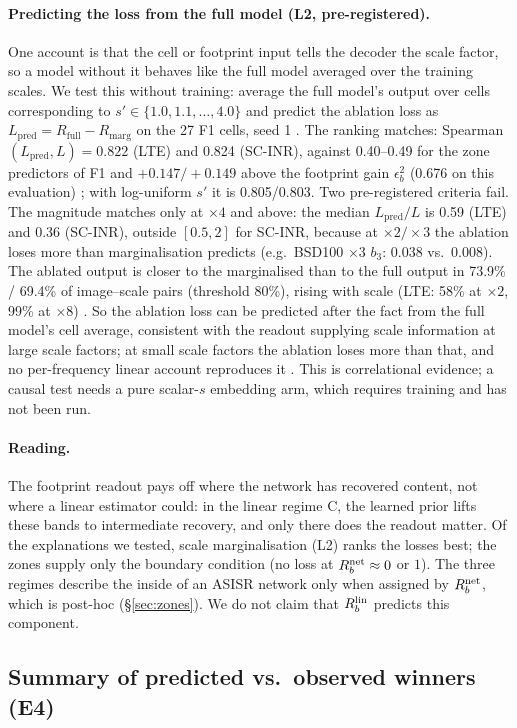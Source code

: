 \paragraph{Predicting the loss from the full model (L2, pre-registered).}
One account is that the cell or footprint input tells the
decoder the scale factor, so a model without it behaves like the full model
averaged over the training scales. We test this without training: average
the full model's output over cells corresponding to $s'\in\{1.0,1.1,\dots,4.0\}$
and predict the ablation loss as $L_{\mathrm{pred}}=R_{\mathrm{full}}-R_{\mathrm{marg}}$
on the 27 F1 cells, seed 1 . The ranking matches:
Spearman$(L_{\mathrm{pred}},L)=0.822$ (LTE) and 0.824 (SC-INR), against
0.40--0.49 for the zone predictors of F1 and $+0.147/+0.149$ above the
footprint gain $\epsilon_b^2$ (0.676 on this evaluation) ; with
log-uniform $s'$ it is 0.805/0.803. Two pre-registered criteria fail. The
magnitude matches only at $\times4$ and above: the median
$L_{\mathrm{pred}}/L$ is 0.59 (LTE) and 0.36 (SC-INR), outside $[0.5,2]$ for
SC-INR, because at $\times2/\times3$ the ablation loses more than
marginalisation predicts (e.g.\ BSD100 $\times3$ $b_3$: 0.038 vs.\ 0.008).
The ablated output is closer to the marginalised than to the full output in
73.9\% / 69.4\% of image--scale pairs (threshold 80\%), rising with scale
(LTE: 58\% at $\times2$, 99\% at $\times8$) . So the ablation loss can be predicted after the fact
from the full model's cell average, consistent with the readout supplying
scale information at large scale factors; at small scale factors the ablation
loses more than that, and no per-frequency linear account reproduces it
. This is correlational evidence; a
causal test needs a pure scalar-$s$ embedding arm, which requires training and
has not been run.

\paragraph{Reading.} The footprint readout pays off where the network has
recovered content, not where a linear estimator could: in the linear
regime C, the learned prior lifts these bands to intermediate recovery, and
only there does the readout matter. Of the explanations we tested, scale
marginalisation (L2) ranks the losses best; the zones supply only the
boundary condition (no loss at $R_b^{\mathrm{net}}\approx0$ or $1$). The three regimes describe the inside of
an ASISR network only when assigned by $R_b^{\mathrm{net}}$, which is post-hoc
(\S\ref{sec:zones}). We do not claim that $R_b^{\mathrm{lin}}$ predicts this component.

\subsection{Summary of predicted vs.\ observed winners (E4)}

